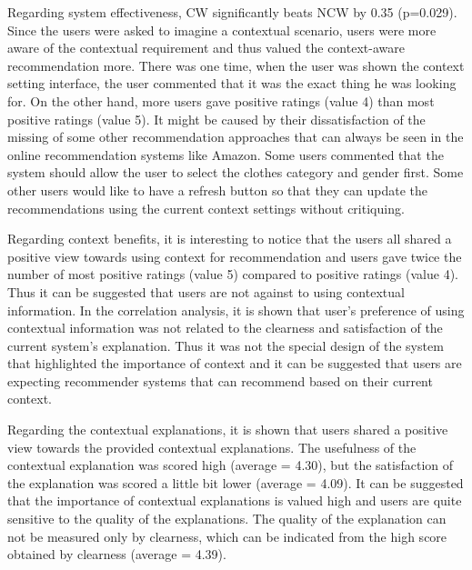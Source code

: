 Regarding system effectiveness, CW significantly beats NCW by 0.35 (p=0.029). Since the users were asked to imagine a contextual scenario, users were more aware of the contextual requirement and thus valued the context-aware recommendation more. There was one time, when the user was shown the context setting interface, the user commented that it was the exact thing he was looking for. On the other hand, more users gave positive ratings (value 4) than most positive ratings (value 5). It might be caused by their dissatisfaction of the missing of some other recommendation approaches that can always be seen in the online recommendation systems like Amazon. Some users commented that the system should allow the user to select the clothes category and gender first. Some other users would like to have a refresh button so that they can update the recommendations using the current context settings without critiquing.

Regarding context benefits, it is interesting to notice that the users all shared a positive view towards using context for recommendation and users gave twice the number of most positive ratings (value 5) compared to positive ratings (value 4). Thus it can be suggested that users are not against to using contextual information. In the correlation analysis, it is shown that user's preference of using contextual information was not related to the clearness and satisfaction of the current system's explanation. Thus it was not the special design of the system that highlighted the importance of context and it can be suggested that users are expecting recommender systems that can recommend based on their current context. 

Regarding the contextual explanations, it is shown that users shared a positive view towards the provided contextual explanations. The usefulness of the contextual explanation was scored high (average = 4.30), but the satisfaction of the explanation was scored a little bit lower (average = 4.09). It can be suggested that the importance of contextual explanations is valued high and users are quite sensitive to the quality of the explanations. The quality of the explanation can not be measured only by clearness, which can be indicated from the high score obtained by clearness (average = 4.39). 

